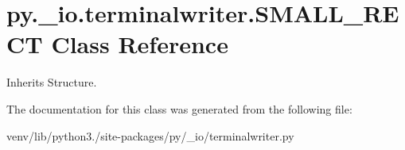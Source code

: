 \hypertarget{classpy_1_1__io_1_1terminalwriter_1_1_s_m_a_l_l___r_e_c_t}{}\section{py.\+\_\+io.\+terminalwriter.\+S\+M\+A\+L\+L\+\_\+\+R\+E\+CT Class Reference}
\label{classpy_1_1__io_1_1terminalwriter_1_1_s_m_a_l_l___r_e_c_t}


Inherits Structure.



The documentation for this class was generated from the following file\+:\begin{DoxyCompactItemize}
\item 
venv/lib/python3./site-\/packages/py/\+\_\+io/terminalwriter.\+py\end{DoxyCompactItemize}
